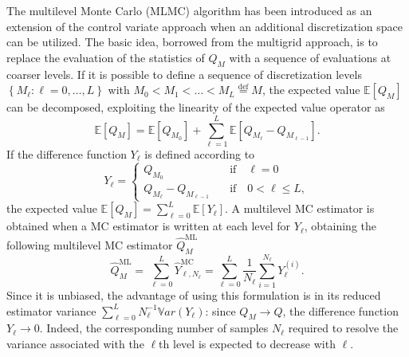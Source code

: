 The multilevel Monte Carlo (MLMC) algorithm has been introduced as an extension of the control variate approach when an additional 
discretization space can be utilized. The basic idea, borrowed from the multigrid approach,
is to replace the evaluation of the statistics of $Q_M$ with a sequence of evaluations at coarser levels. If it is 
possible to define a sequence of discretization levels $\left\{ M_\ell: \ell = 0, \dots, L \right\}$ with 
$M_0 < M_1 < \dots < M_L \stackrel{\mathrm{def}}{=} M$, the expected value $\mathbb{E}\left[{Q_M}\right]$ can be decomposed, 
exploiting the linearity of the expected value operator as
\begin{equation}
 \mathbb{E}\left[{Q_{M}}\right] = \mathbb{E}\left[{Q_{M_0}}\right] + \sum_{\ell = 1}^L \mathbb{E }\left[ Q_{M_{\ell}} - Q_{M_{\ell-1}} \right].
\end{equation}
If the difference function $Y_\ell$ is defined according to
\begin{equation}
 Y_\ell = \left\{
 \begin{split}
 Q_{M_0} \quad &\mathrm{if} \quad \ell=0 \\
 Q_{M_{\ell}} - Q_{M_{\ell-1}} \quad &\mathrm{if} \quad 0<\ell\leq L,
 \end{split}
 \right.
\end{equation}
the expected value $\mathbb{E}\left[{Q_M}\right]=\sum_{\ell=0}^{L}{  \mathbb{E}\left[Y_\ell\right]   }$. A multilevel MC estimator is obtained when a MC estimator is
written at each level for $Y_\ell$, obtaining the following multilevel MC estimator $\hat{Q}_M^{\mathrm{ML}}$
\begin{equation}
 \hat{Q}_M^{\mathrm{ML}} = \, \sum_{\ell = 0}^L \hat{Y}_{\ell, N_\ell}^{\mathrm{MC}} 
 = \sum_{\ell = 0}^L \frac{1}{N_\ell} \sum_{i=1}^{N_\ell} Y_\ell^{(i)}.
\end{equation}
Since it is unbiased, the advantage of using this formulation is in its reduced estimator variance 
$\sum_{\ell=0}^{L} N_\ell^{-1} \mathbb{V}ar\left({Y_\ell}\right)$: since $Q_M \rightarrow Q$, 
the difference function $Y_\ell \rightarrow 0$. Indeed, the corresponding number of
samples $N_\ell$ required to resolve the variance associated with the $\ell$th level is expected 
to decrease with $\ell$.
 
